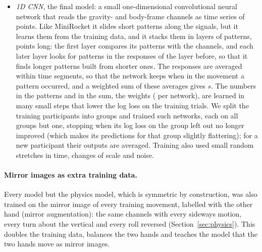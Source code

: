 \begin{itemize}[nosep,leftmargin=1.2em]
    fixed set of short patterns along the  gravity-frame channels: at each moment a pattern is
    multiplied point by point with the stretch of signal under it and the products are added up, which gives a large
    response where the signal looks like the pattern. Each pattern is also stretched to several time scales, and for
    each the share of the movement where it responds becomes one summary number ( in all);
    a logistic regression is fitted on these numbers.
  \item \emph{1D CNN}, the final model: a small one-dimensional convolutional neural network that reads the
     gravity- and body-frame channels as time series of  points. Like
    MiniRocket it slides short patterns along the signals, but it learns them from the training data, and it stacks
    them in  layers of  patterns,  points long: the
    first layer compares its patterns with the channels, and each later layer looks for patterns in the responses of
    the layer before, so that it finds longer patterns built from shorter ones. The responses are averaged within
     time segments, so that the network keeps when in the movement a pattern occurred, and a
    weighted sum of these averages gives $s$. The numbers in the patterns and in the sum, the weights
    ( per network), are learned in many small steps that lower the log loss on the training
    trials. We split the training participants into  groups and
    trained  such networks, each on all groups but one, stopping when its log loss on the group
    left out no longer improved (which makes its predictions for that group slightly flattering); for a new
    participant their outputs are averaged. Training also used small random stretches in time, changes of scale and
    noise.
\end{itemize}

\paragraph{Mirror images as extra training data.} Every model but the physics model, which is symmetric by
construction, was also trained on the mirror image of every training movement, labelled with the other hand (mirror
augmentation): the same channels with every sideways motion, every turn about the vertical and every roll reversed
(Section~\ref{sec:physics}). This doubles the training data, balances the two hands and teaches the model that the two
hands move as mirror images.

